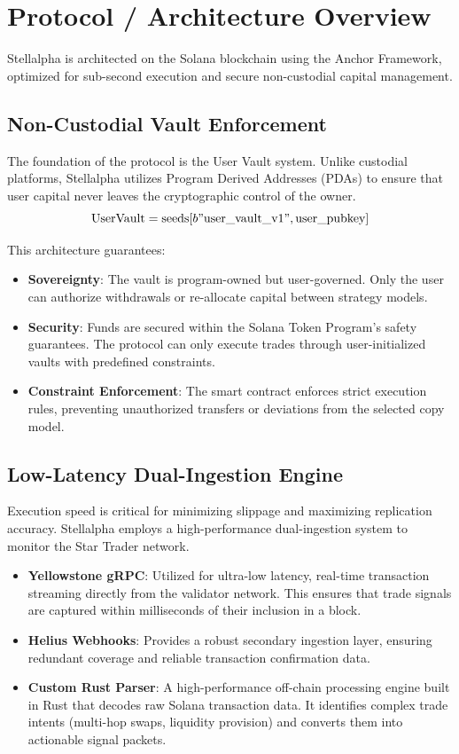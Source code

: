 \section{Protocol / Architecture Overview}

Stellalpha is architected on the Solana blockchain using the Anchor Framework, optimized for sub-second execution and secure non-custodial capital management.

\subsection{Non-Custodial Vault Enforcement}

The foundation of the protocol is the User Vault system. Unlike custodial platforms, Stellalpha utilizes Program Derived Addresses (PDAs) to ensure that user capital never leaves the cryptographic control of the owner.
\[
\text{UserVault} = \text{seeds}[b"\text{user\_vault\_v1}", \text{user\_pubkey}]
\]

This architecture guarantees:
\begin{itemize}
  \item \textbf{Sovereignty}: The vault is program-owned but user-governed. Only the user can authorize withdrawals or re-allocate capital between strategy models.
  \item \textbf{Security}: Funds are secured within the Solana Token Program's safety guarantees. The protocol can only execute trades through user-initialized vaults with predefined constraints.
  \item \textbf{Constraint Enforcement}: The smart contract enforces strict execution rules, preventing unauthorized transfers or deviations from the selected copy model.
\end{itemize}

\subsection{Low-Latency Dual-Ingestion Engine}

Execution speed is critical for minimizing slippage and maximizing replication accuracy. Stellalpha employs a high-performance dual-ingestion system to monitor the Star Trader network.

\begin{itemize}
  \item \textbf{Yellowstone gRPC}: Utilized for ultra-low latency, real-time transaction streaming directly from the validator network. This ensures that trade signals are captured within milliseconds of their inclusion in a block.
  \item \textbf{Helius Webhooks}: Provides a robust secondary ingestion layer, ensuring redundant coverage and reliable transaction confirmation data.
  \item \textbf{Custom Rust Parser}: A high-performance off-chain processing engine built in Rust that decodes raw Solana transaction data. It identifies complex trade intents (multi-hop swaps, liquidity provision) and converts them into actionable signal packets.
\end{itemize}

